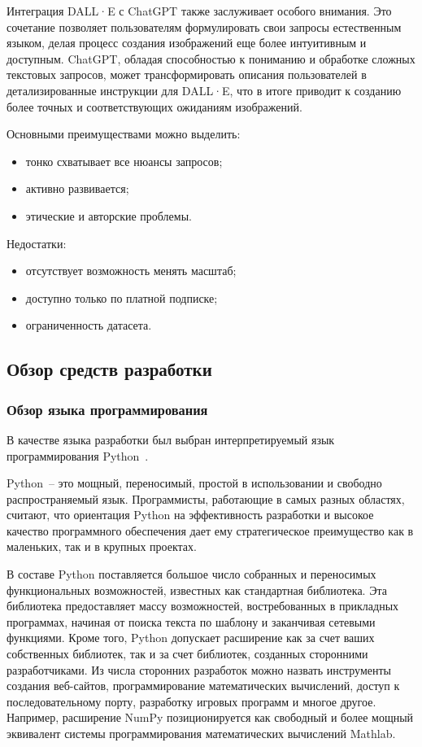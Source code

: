 Интеграция DALL·E с ChatGPT также заслуживает особого внимания. Это сочетание позволяет пользователям формулировать свои запросы естественным языком, делая процесс создания изображений еще более интуитивным и доступным. ChatGPT, обладая способностью к пониманию и обработке сложных текстовых запросов, может трансформировать описания пользователей в детализированные инструкции для DALL·E, что в итоге приводит к созданию более точных и соответствующих ожиданиям изображений.

Основными преимуществами можно выделить:
\begin{itemize}
    \item тонко схватывает все нюансы запросов;
    \item активно развивается;
    \item этические и авторские проблемы.
\end{itemize}

Недостатки:
\begin{itemize}
    \item отсутствует возможность менять масштаб;
    \item доступно только по платной подписке;
    \item ограниченность датасета.
\end{itemize}

\subsection{Обзор средств разработки}

\subsubsection{Обзор языка программирования}

В качестве языка разработки был выбран интерпретируемый язык программирования Python~\cite{python}.

Python~-- это мощный, переносимый, простой в использовании и свободно распространяемый язык. Программисты, работающие в самых  разных областях, считают, что ориентация Python на эффективность разработки и высокое качество программного обеспечения дает ему стратегическое преимущество как в маленьких, так и в крупных проектах.

В составе Python поставляется большое число собранных и переносимых функциональных возможностей, известных как 
стандартная библиотека. Эта библиотека предоставляет массу возможностей, востребованных в прикладных программах, начиная от поиска текста по шаблону и заканчивая сетевыми функциями. Кроме того, Python допускает расширение как за счет ваших собственных библиотек, так и за счет библиотек, созданных сторонними разработчиками. Из числа сторонних разработок можно назвать инструменты создания веб-сайтов, программирование математических вычислений, доступ к последовательному порту, разработку игровых программ и многое другое. Например, расширение NumPy позиционируется как свободный и более мощный эквивалент системы программирования математических вычислений Mathlab.

